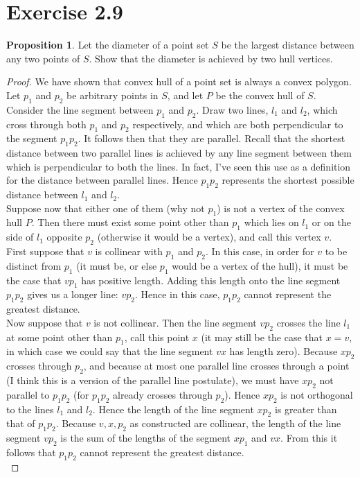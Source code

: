 \documentclass[12pt]{article}
\theoremstyle{definition}
\newtheorem{proposition}{Proposition}
\begin{document}
\section{Exercise 2.9}


\begin{proposition}
Let the diameter of a point set $S$ be the largest distance between any two points of $S$. Show that the diameter is achieved by two hull vertices. 
\end{proposition}

\begin{proof}
We have shown that convex hull of a point set is always a convex polygon. Let $p_1$ and $p_2$ be arbitrary points in $S$, and let $P$ be the convex hull of $S$. Consider the line segment between $p_1$ and $p_2$. Draw two lines, $l_1$ and $l_2$, which cross through both $p_1$ and $p_2$ respectively, and which are both perpendicular to the segment $p_1p_2$. It follows then that they are parallel. Recall that the shortest distance between two parallel lines is achieved by any  line segment between them which is perpendicular to both the lines. In fact, I've seen this use as a definition for the distance between parallel lines. Hence $p_1p_2$ represents the shortest possible distance between $l_1$ and $l_2$. \\
 
Suppose now that either one of them (why not $p_1$) is not a vertex of the convex hull $P$. Then there must exist some point other than $p_1$ which lies on $l_1$ or on the side of $l_1$ opposite $p_2$ (otherwise it would be a vertex), and call this vertex $v$.\\ 
 
 
First suppose that $v$ is collinear with $p_1$ and $p_2$. In this case, in order for $v$ to be distinct from $p_1$ (it must be, or else $p_1$ would be a vertex of the hull), it must be the case that $vp_1$ has positive length. Adding this length onto the line segment $p_1p_2$ gives us a longer line: $vp_2$. Hence in this case, $p_1p_2$ cannot represent the greatest distance. \\

Now suppose that $v$ is not collinear. Then the line segment $vp_2$ crosses the line $l_1$ at some point other than $p_1$, call this point $x$ (it may still be the case that $x=v$, in which case we could say that the line segment $vx$ has length zero). Because $xp_2$ crosses through $p_2$, and because at most one parallel line crosses through a point (I think this is a version of the parallel line postulate), we must have $xp_2$ not parallel to $p_1p_2$ (for $p_1p_2$ already crosses through $p_2$). Hence $xp_2$ is not orthogonal to the lines $l_1$ and $l_2$. Hence the length of the line segment $xp_2$ is greater than that of $p_1p_2$. Because $v,x,p_2$ as constructed are collinear, the length of the line segment $vp_2$ is the sum of the lengths of the segment $xp_1$ and $vx$. From this it follows that $p_1p_2$ cannot represent the greatest distance. \\


\end{proof}
\end{document}

